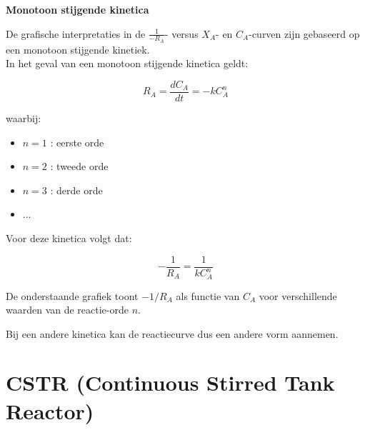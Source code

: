 \documentclass{ximera}
\begin{document}
\begin{remark} \textbf{Monotoon stijgende kinetica}

De grafische interpretaties in de $\frac{1}{-R_A}$- versus $X_A$- en $C_A$-curven zijn gebaseerd op een monotoon stijgende kinetiek.\\

In het geval van een monotoon stijgende kinetica geldt:

\[
R_A = \frac{dC_A}{dt} = -k C_A^n
\]

waarbij:

\begin{itemize}
\item $n=1$ : eerste orde
\item $n=2$ : tweede orde
\item $n=3$ : derde orde
\item $\dots$
\end{itemize}

Voor deze kinetica volgt dat:

\[
-\frac{1}{R_A} = \frac{1}{k C_A^n}
\]

De onderstaande grafiek toont $-1/R_A$ als functie van $C_A$
voor verschillende waarden van de reactie-orde $n$. 


Bij een andere kinetica kan de reactiecurve dus een andere vorm aannemen.
\end{remark}
\text{ }

\section*{CSTR (Continuous Stirred Tank Reactor)}
\end{document}
